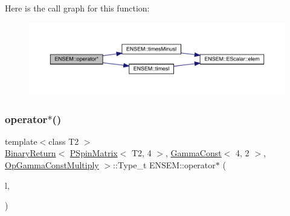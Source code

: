 Here is the call graph for this function\+:\nopagebreak
\begin{figure}[H]
\begin{center}
\leavevmode
\includegraphics[width=350pt]{d6/df5/group__primspinmatrix_gaf4a854dbb554a35d450e52f9edaae13e_cgraph}
\end{center}
\end{figure}
\mbox{\label{group__primspinmatrix_ga5a4c1e3861766e39bd44a3b7be45b5bb}} 
\subsubsection{\texorpdfstring{operator$\ast$()}{operator*()}\hspace{0.1cm}{\footnotesize\ttfamily [19/64]}}
{\footnotesize\ttfamily template$<$class T2 $>$ \\
\mbox{\hyperlink{structENSEM_1_1BinaryReturn}{Binary\+Return}}$<$ \mbox{\hyperlink{classENSEM_1_1PSpinMatrix}{P\+Spin\+Matrix}}$<$ T2, 4 $>$, \mbox{\hyperlink{classENSEM_1_1GammaConst}{Gamma\+Const}}$<$ 4, 2 $>$, \mbox{\hyperlink{structENSEM_1_1OpGammaConstMultiply}{Op\+Gamma\+Const\+Multiply}} $>$\+::Type\+\_\+t E\+N\+S\+E\+M\+::operator$\ast$ (\begin{DoxyParamCaption}\item[{const \mbox{\hyperlink{classENSEM_1_1PSpinMatrix}{P\+Spin\+Matrix}}$<$ T2, 4 $>$ \&}]{l,  }\item[{const \mbox{\hyperlink{classENSEM_1_1GammaConst}{Gamma\+Const}}$<$ 4, 2 $>$ \&}]{ }\end{DoxyParamCaption})\hspace{0.3cm}{\ttfamily [inline]}}

\mbox{\label{group__primspinmatrix_ga4489f67258a145c07f7805077699ec24}} 
